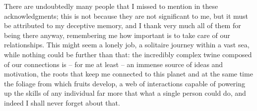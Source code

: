 There are undoubtedly many people that I missed to mention in these acknowledgments; this is not because they are not significant to me, but it must be attributed to my deceptive memory, and I thank very much all of them for being there anyway, remembering me how important is to take care of our relationships. This might seem a lonely job, a solitaire journey within a vast sea, while nothing could be further than that: the incredibly complex twine composed of our connections is -- for me at least -- an immense source of ideas and motivation, the roots that keep me connected to this planet and at the same time the foliage from which fruits develop, a web of interactions capable of powering up the skills of any individual far more that what a single person could do, and indeed I shall never forget about that.